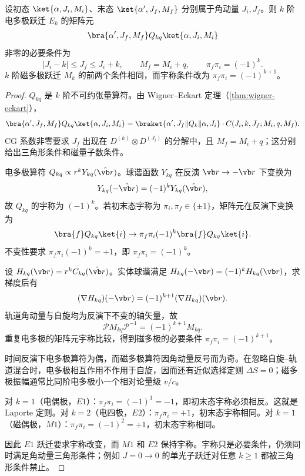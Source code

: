 \begin{theorem}[多极跃迁选择定则]
设初态 $\ket{\alpha,J_i,M_i}$、末态 $\ket{\alpha',J_f,M_f}$ 分别属于角动量 $J_i,J_f$。则 $k$ 阶电多极跃迁 $E_k$ 的矩阵元
\[
\bra{\alpha',J_f,M_f}Q_{kq}\ket{\alpha,J_i,M_i}
\]
非零的必要条件为
\[
|J_i-k|\le J_f\le J_i+k,
\qquad M_f=M_i+q,
\qquad \pi_f\pi_i=(-1)^k.
\]
$k$ 阶磁多极跃迁 $M_k$ 的前两个条件相同，而宇称条件改为
$\pi_f\pi_i=(-1)^{k+1}$。
\label{thm:multipole-selection-rules}
\end{theorem}

\begin{proof}
$Q_{kq}$ 是 $k$ 阶不可约张量算符。由 Wigner--Eckart 定理（\cref{thm:wigner-eckart}），
\[
\bra{\alpha',J_f,M_f}Q_{kq}\ket{\alpha,J_i,M_i}
=\braket{\alpha',J_f\|Q_k\|\alpha,J_i}\cdot C(J_i,k,J_f;M_i,q,M_f).
\]
CG 系数非零要求 $J_f$ 出现在 $D^{(k)}\otimes D^{(J_i)}$ 的分解中，且
$M_f=M_i+q$；这分别给出三角形条件和磁量子数条件。

电多极算符 $Q_{kq}\propto r^k Y_{kq}(\hat{\vb r})$。球谐函数 $Y_{kq}$ 在反演 $\vb r\to-\vb r$ 下变换为
\[
Y_{kq}(-\hat{\vb r})=(-1)^k Y_{kq}(\hat{\vb r}),
\]
故 $Q_{kq}$ 的宇称为 $(-1)^k$。若初末态宇称为 $\pi_i,\pi_f\in\{\pm1\}$，矩阵元在反演下变换为
\[
\bra{f}Q_{kq}\ket{i}\to\pi_f\pi_i(-1)^k\bra{f}Q_{kq}\ket{i}.
\]
不变性要求 $\pi_f\pi_i(-1)^k=+1$，即 $\pi_f\pi_i=(-1)^k$。

设 $H_{kq}(\vb r)=r^kC_{kq}(\hat{\vb r})$。实体球谐满足 $H_{kq}(-\vb r)=(-1)^kH_{kq}(\vb r)$，求梯度后有
\[
(\nabla H_{kq})(-\vb r)=(-1)^{k+1}(\nabla H_{kq})(\vb r).
\]
轨道角动量与自旋均为反演下不变的轴矢量，故
\[
\mathcal P M_{kq}\mathcal P^{-1}=(-1)^{k+1}M_{kq}.
\]
重复电多极的矩阵元宇称比较，得到磁多极的必要条件 $\pi_f\pi_i=(-1)^{k+1}$。

时间反演下电多极算符为偶，而磁多极算符因角动量反号而为奇。在忽略自旋--轨道混合时，电多极相互作用不作用于自旋，因而还有近似选择定则 $\Delta S=0$；磁多极振幅通常比同阶电多极小一个相对论量级 $v/c$。

对 $k=1$（电偶极，$E1$）：$\pi_f\pi_i=(-1)^1=-1$，即初末态宇称必须相反。这就是 Laporte 定则。对 $k=2$（电四极，$E2$）：$\pi_f\pi_i=+1$，初末态宇称相同。对 $k=1$（磁偶极，$M1$）：$\pi_f\pi_i=(-1)^2=+1$，初末态宇称相同。

因此 $E1$ 跃迁要求宇称改变，而 $M1$ 和 $E2$ 保持宇称。宇称只是必要条件，仍须同时满足角动量三角形条件；例如 $J=0\to0$ 的单光子跃迁对任意 $k\ge1$ 都被三角形条件禁止。
\end{proof}


\par\medskip
\par\medskip

